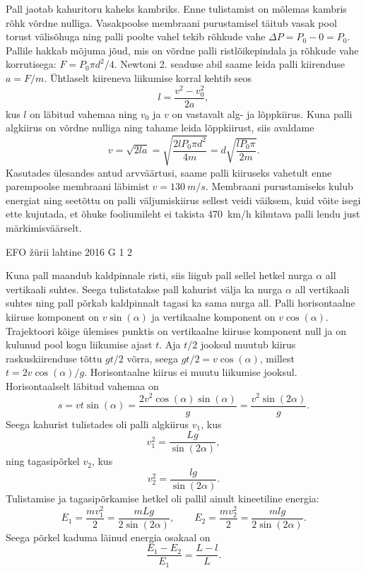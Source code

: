 \documentclass[11pt]{article}
\begin{document}
{{\ifSolution
Pall jaotab kahuritoru kaheks kambriks. Enne tulistamist on mõlemas kambris rõhk võrdne nulliga. Vasakpoolse membraani purustamisel täitub vasak pool torust välisõhuga ning palli poolte vahel tekib rõhkude vahe $\Delta P=P_0-0=P_0$. Pallile hakkab mõjuma jõud, mis on võrdne palli ristlõikepindala ja rõhkude vahe korrutisega: $F=P_0\pi d^2/4$. Newtoni 2. seaduse abil saame leida palli kiirenduse $a=F/m$. Ühtlaselt kiireneva liikumise korral kehtib seos
\[ l=\frac{v^2-v_0^2}{2a}, \]
kus $l$ on läbitud vahemaa ning $v_0$ ja $v$ on vastavalt alg- ja lõppkiirus. Kuna palli algkiirus on võrdne nulliga ning tahame leida lõppkiirust, siis avaldame
\[ v=\sqrt{2la}=\sqrt{\frac{2lP_0\pi d^2}{4m}}=d\sqrt{\frac{lP_0\pi}{2m}}.\]
Kasutades ülesandes antud arvväärtusi, saame palli kiiruseks vahetult enne parempoolse membraani läbimist $v=\SI{130}{m/s}$. Membraani purustamiseks kulub energiat ning seetõttu on palli väljumiskiirus sellest veidi väiksem, kuid võite isegi ette kujutada, et õhuke fooliumileht ei takista \SI{470}{km/h} kihutava palli lendu just märkimisväärselt.
\fi
}

{EFO žürii} %
{lahtine} %
{2016} %
{G 1} %
{2} %
{

\ifSolution
Kuna pall maandub kaldpinnale risti, siis liigub pall sellel hetkel nurga $\alpha$ all vertikaali suhtes. Seega tulistatakse pall kahurist välja ka nurga $\alpha$ all vertikaali suhtes ning pall põrkab kaldpinnalt tagasi ka sama nurga all. Palli horisontaalne kiiruse komponent on $v\sin(\alpha)$ ja vertikaalne komponent on $v\cos(\alpha)$. Trajektoori kõige ülemises punktis on vertikaalne kiiruse komponent null ja on kulunud pool kogu liikumise ajast $t$. Aja $t/2$ jooksul muutub kiirus raskuskiirenduse tõttu $gt/2$ võrra, seega $gt/2 =v\cos(\alpha)$, millest $t=2v\cos(\alpha)/g$. Horisontaalne kiirus ei muutu liikumise jooksul. Horisontaalselt läbitud vahemaa on $$s=vt\sin(\alpha)=\frac{2v^2\cos(\alpha)\sin(\alpha)}{g} = \frac{v^2\sin(2\alpha)}{g}.$$
Seega kahurist tulistades oli palli algkiirus $v_1$, kus
\[ v_1^2 = \frac{Lg}{\sin(2\alpha)}, \]
ning tagasipõrkel $v_2$, kus
\[ v_2^2 = \frac{lg}{\sin(2\alpha)}. \]
Tulistamise ja tagasipõrkamise hetkel oli pallil ainult kineetiline energia:
\[ E_1 = \frac{mv_1^2}{2}=\frac{mLg}{2\sin(2\alpha)},\quad\quad E_2 =\frac{mv_2^2}{2} = \frac{mlg}{2\sin(2\alpha)}. \]
Seega põrkel kaduma läinud energia osakaal on
\[ \frac{E_1-E_2}{E_1} = \frac{L-l}{L}. \]
\fi
}

}
\end{document}

